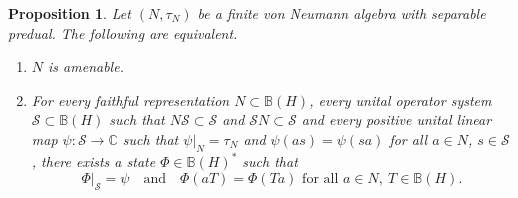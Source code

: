 \documentclass[12pt]{amsart} %
\theoremstyle{plain}
\newtheorem{proposition}[theorem]{Proposition}
\theoremstyle{definition}
\newcommand{\C}{\mathbb{C}}
\begin{document}
\begin{proposition}\label{lem:N-central-extension}
Let $(N,\tau_N)$ be a finite von Neumann algebra with separable predual. The following are equivalent.
\begin{enumerate}
\item $N$ is amenable.
\item For every faithful representation $N\subset\mathbb{B}(H)$, every unital operator system $\mathcal S\subset \mathbb{B}(H)$ such that $N\mathcal S\subset \mathcal S$ and $\mathcal S N\subset \mathcal S$ and every positive unital linear map $\psi:\mathcal S\to\C$ such that $\psi\vert_N=\tau_N$ and $\psi(as)=\psi(sa)$ for all $a\in N$, $s\in\mathcal S$, there exists a state $\Phi\in\mathbb{B}(H)^*$ such that 
$$\Phi\vert_\mathcal{S}=\psi\quad\text{and}\quad\Phi(aT)=\Phi(Ta)\text{ for all }a\in N,\ T\in\mathbb{B}(H).$$
\end{enumerate}
\end{proposition}
\end{document}
